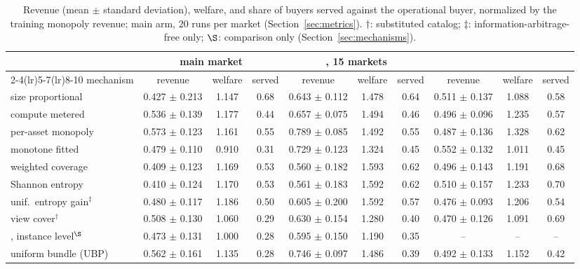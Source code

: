 
\begin{table}[t]
  \centering
  \small
  \setlength{\tabcolsep}{4pt}
  \caption{Revenue (mean $\pm$ standard deviation), welfare, and share of buyers served against the operational buyer, normalized by the training monopoly revenue; main arm, 20 runs per market (Section~\ref{sec:metrics}). $\dagger$: substituted catalog; $\ddagger$: information-arbitrage-free only; $\S$: comparison only (Section~\ref{sec:mechanisms}).}
  \label{tab:main}
  \begin{tabular}{@{}lccccccccc@{}}
    \toprule
    & \multicolumn{3}{c}{\sqlshare{} main market} & \multicolumn{3}{c}{\sqlshare{}, 15 markets} & \multicolumn{3}{c}{\tpch{}} \\
    \cmidrule(lr){2-4}\cmidrule(lr){5-7}\cmidrule(lr){8-10}
    mechanism & revenue & welfare & served & revenue & welfare & served & revenue & welfare & served \\
    \midrule
    size proportional & 0.427 $\pm$ 0.213 & 1.147 & 0.68 & 0.643 $\pm$ 0.112 & 1.478 & 0.64 & 0.511 $\pm$ 0.137 & 1.088 & 0.58 \\
    compute metered & 0.536 $\pm$ 0.139 & 1.177 & 0.44 & 0.657 $\pm$ 0.075 & 1.494 & 0.46 & 0.496 $\pm$ 0.096 & 1.235 & 0.57 \\
    per-asset monopoly & 0.573 $\pm$ 0.123 & 1.161 & 0.55 & 0.789 $\pm$ 0.085 & 1.492 & 0.55 & 0.487 $\pm$ 0.136 & 1.328 & 0.62 \\
    monotone fitted & 0.479 $\pm$ 0.110 & 0.910 & 0.31 & 0.729 $\pm$ 0.123 & 1.324 & 0.45 & 0.552 $\pm$ 0.132 & 1.011 & 0.45 \\
    \midrule
    \qirana{} weighted coverage & 0.409 $\pm$ 0.123 & 1.169 & 0.53 & 0.560 $\pm$ 0.182 & 1.593 & 0.62 & 0.496 $\pm$ 0.143 & 1.191 & 0.68 \\
    \qirana{} Shannon entropy & 0.410 $\pm$ 0.124 & 1.170 & 0.53 & 0.561 $\pm$ 0.183 & 1.592 & 0.62 & 0.510 $\pm$ 0.157 & 1.233 & 0.70 \\
    \qirana{} unif.\ entropy gain$^{\ddagger}$ & 0.480 $\pm$ 0.117 & 1.186 & 0.50 & 0.605 $\pm$ 0.200 & 1.592 & 0.57 & 0.476 $\pm$ 0.093 & 1.206 & 0.54 \\
    \querymarket{} view cover$^{\dagger}$ & 0.508 $\pm$ 0.130 & 1.060 & 0.29 & 0.630 $\pm$ 0.154 & 1.280 & 0.40 & 0.470 $\pm$ 0.126 & 1.091 & 0.69 \\
    \querymarket{}, instance level$^{\S}$ & 0.473 $\pm$ 0.131 & 1.000 & 0.28 & 0.595 $\pm$ 0.150 & 1.190 & 0.35 & -- & -- & -- \\
    \midrule
    uniform bundle (UBP) & 0.562 $\pm$ 0.161 & 1.135 & 0.28 & 0.746 $\pm$ 0.097 & 1.486 & 0.39 & 0.492 $\pm$ 0.133 & 1.152 & 0.42 \\

\end{tabular}
\end{table}
